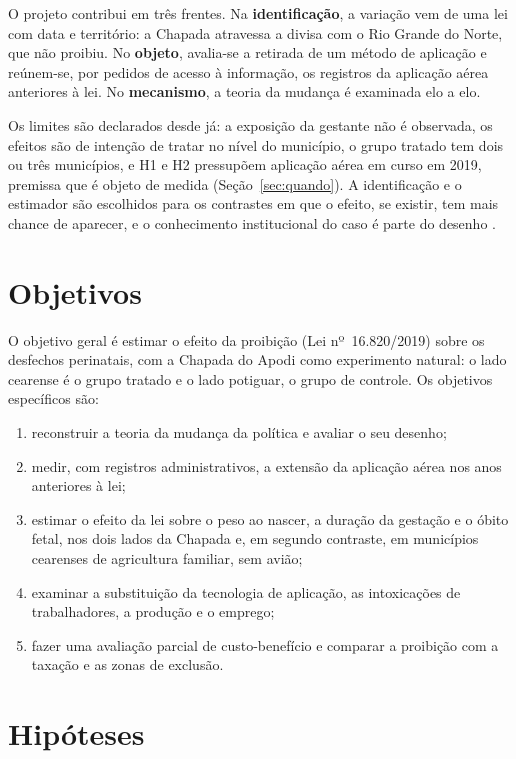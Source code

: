 O projeto contribui em três frentes. Na \textbf{identificação}, a variação vem
de uma lei com data e território: a Chapada atravessa a divisa com o Rio
Grande do Norte, que não proibiu. No \textbf{objeto}, avalia-se a retirada de
um método de aplicação e reúnem-se, por pedidos de acesso à informação, os
registros da aplicação aérea anteriores à lei. No \textbf{mecanismo}, a teoria
da mudança é examinada elo a elo.

Os limites são declarados desde já: a exposição da gestante não é observada,
os efeitos são de intenção de tratar no nível do município, o grupo tratado
tem dois ou três municípios, e H1 e H2 pressupõem aplicação aérea em curso em
2019, premissa que é objeto de medida (Seção~\ref{sec:quando}). A identificação e o estimador são escolhidos para
os contrastes em que o efeito, se existir, tem mais chance de aparecer, e o
conhecimento institucional do caso é parte do desenho
\cite{cunningham2021mixtape}.

\section{Objetivos}

O objetivo geral é estimar o efeito da proibição (Lei nº~16.820/2019) sobre
os desfechos perinatais, com a Chapada do Apodi como experimento natural: o
lado cearense é o grupo tratado e o lado potiguar, o grupo de controle. Os
objetivos específicos são:

\begin{enumerate}[label=\alph*)]
\item reconstruir a teoria da mudança da política e avaliar o seu desenho;
\item medir, com registros administrativos, a extensão da aplicação aérea nos
anos anteriores à lei;
\item estimar o efeito da lei sobre o peso ao nascer, a duração da gestação e o
óbito fetal, nos dois lados da Chapada e, em segundo contraste, em municípios
cearenses de agricultura familiar, sem avião;
\item examinar a substituição da tecnologia de aplicação, as intoxicações de
trabalhadores, a produção e o emprego;
\item fazer uma avaliação parcial de custo-benefício e comparar a proibição
com a taxação e as zonas de exclusão.
\end{enumerate}

\section{Hipóteses}

